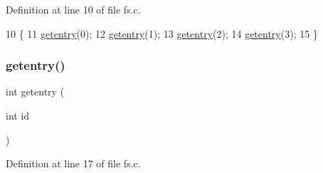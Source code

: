 Definition at line 10 of file fs.\+c.


\begin{DoxyCode}
10                   \{
11     \hyperlink{a00134_a3fb32d07d3bd05144a196c94fc59c0d1_a3fb32d07d3bd05144a196c94fc59c0d1}{getentry}(0);
12     \hyperlink{a00134_a3fb32d07d3bd05144a196c94fc59c0d1_a3fb32d07d3bd05144a196c94fc59c0d1}{getentry}(1);
13     \hyperlink{a00134_a3fb32d07d3bd05144a196c94fc59c0d1_a3fb32d07d3bd05144a196c94fc59c0d1}{getentry}(2);
14     \hyperlink{a00134_a3fb32d07d3bd05144a196c94fc59c0d1_a3fb32d07d3bd05144a196c94fc59c0d1}{getentry}(3);
15 \}
\end{DoxyCode}
\mbox{\label{a00134_a3fb32d07d3bd05144a196c94fc59c0d1_a3fb32d07d3bd05144a196c94fc59c0d1}} 
\subsubsection{\texorpdfstring{getentry()}{getentry()}}
{\footnotesize\ttfamily int getentry (\begin{DoxyParamCaption}\item[{int}]{id }\end{DoxyParamCaption})}



Definition at line 17 of file fs.\+c.


